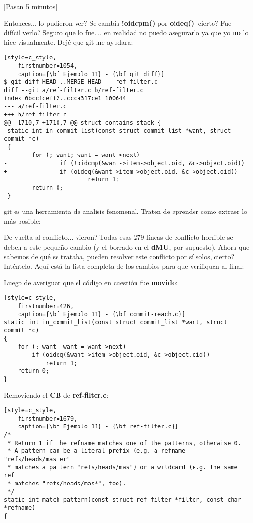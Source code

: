 [Pasan 5 minutos]

Entonces... lo pudieron ver? Se cambia {\bf !oidcpm()} por {\bf oideq()}, cierto? Fue difícil verlo? Seguro que lo fue....
en realidad no puedo asegurarlo ya que yo {\bf no} lo hice visualmente. Dejé que git me ayudara:

\begin{lstlisting}[style=c_style,
	firstnumber=1054,
	caption={\bf Ejemplo 11} - {\bf git diff}]
$ git diff HEAD...MERGE_HEAD -- ref-filter.c
diff --git a/ref-filter.c b/ref-filter.c
index 0bccfceff2..ccca317ce1 100644
--- a/ref-filter.c
+++ b/ref-filter.c
@@ -1710,7 +1710,7 @@ struct contains_stack {
 static int in_commit_list(const struct commit_list *want, struct commit *c)
 {
        for (; want; want = want->next)
-               if (!oidcmp(&want->item->object.oid, &c->object.oid))
+               if (oideq(&want->item->object.oid, &c->object.oid))
                        return 1;
        return 0;
 }
\end{lstlisting}
git es una herramienta de analisis fenomenal. Traten de aprender como extraer lo más posible:

De vuelta al conflicto... vieron? Todas esas 279 líneas de conflicto horrible se deben a este pequeño cambio (y el borrado
en el {\bf dMU}, por supuesto). Ahora que sabemos de qué se trataba, pueden resolver este conflicto por sí solos, cierto?
Inténtelo. Aquí está la lista completa de los cambios para que verifiquen al final:

Luego de averiguar que el código en cuestión fue {\bf movido}:
\begin{lstlisting}[style=c_style,
	firstnumber=426,
	caption={\bf Ejemplo 11} - {\bf commit-reach.c}]
static int in_commit_list(const struct commit_list *want, struct commit *c)
{
	for (; want; want = want->next)
		if (oideq(&want->item->object.oid, &c->object.oid))
			return 1;
	return 0;
}
\end{lstlisting}

Removiendo el {\bf CB} de {\bf ref-filter.c}:
\begin{lstlisting}[style=c_style,
	firstnumber=1679,
	caption={\bf Ejemplo 11} - {\bf ref-filter.c}]
/*
 * Return 1 if the refname matches one of the patterns, otherwise 0.
 * A pattern can be a literal prefix (e.g. a refname "refs/heads/master"
 * matches a pattern "refs/heads/mas") or a wildcard (e.g. the same ref
 * matches "refs/heads/mas*", too).
 */
static int match_pattern(const struct ref_filter *filter, const char *refname)
{
\end{lstlisting}

